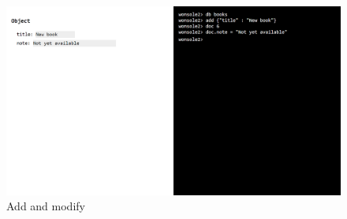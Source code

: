 \documentclass[10pt,a4paper,oneside]{report}
\begin{document}
\begin{figure}
\centering
\includegraphics[width=\textwidth]{screenshot/wonsole2/wonsole2-55.png}
\caption{Add and modify}
\label{wonsole2-55}
\end{figure}
\end{document}
